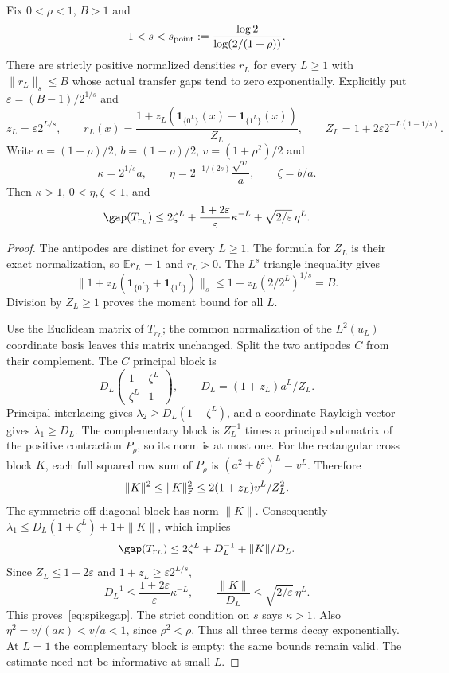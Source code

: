 \begin{theorem}\label{thm:spikes}
Fix $0<\rho<1$, $B>1$ and
\[
 1<s<s_{\rm point}:=\frac{\log2}{\log(2/(1+\rho))}.
\]
There are strictly positive normalized densities $r_L$ for every $L\ge1$
with $\|r_L\|_s\le B$ whose actual transfer gaps tend to zero
exponentially. Explicitly put $\varepsilon=(B-1)/2^{1/s}$ and
\[
 z_L=\varepsilon2^{L/s},\qquad
 r_L(x)=\frac{1+z_L(\mathbf1_{\{0^L\}}(x)+\mathbf1_{\{1^L\}}(x))}{Z_L},
 \qquad Z_L=1+2\varepsilon2^{-L(1-1/s)}.
\]
Write $a=(1+\rho)/2$, $b=(1-\rho)/2$, $v=(1+\rho^2)/2$ and
\[
 \kappa=2^{1/s}a,\qquad
 \eta=2^{-1/(2s)}\frac{\sqrt v}{a},\qquad \zeta=b/a.
\]
Then $\kappa>1$, $0<\eta,\zeta<1$, and
\begin{equation}\label{eq:spikegap}
 \gap(T_{r_L})\le2\zeta^L+\frac{1+2\varepsilon}{\varepsilon}\kappa^{-L}
                      +\sqrt{2/\varepsilon}\,\eta^L.
\end{equation}
\end{theorem}
\begin{proof}
The antipodes are distinct for every $L\ge1$. The formula for $Z_L$
is their exact normalization, so $\mathbb E r_L=1$ and $r_L>0$.
The $L^s$ triangle inequality gives
\[
 \|1+z_L(\mathbf1_{\{0^L\}}+\mathbf1_{\{1^L\}})\|_s
 \le1+z_L(2/2^L)^{1/s}=B.
\]
Division by $Z_L\ge1$ proves the moment bound for all $L$.

Use the Euclidean matrix of $T_{r_L}$; the common normalization of the
$L^2(u_L)$ coordinate basis leaves this matrix unchanged. Split the two
antipodes $C$ from their complement. The $C$ principal block is
\[
 D_L\begin{pmatrix}1&\zeta^L\\\zeta^L&1\end{pmatrix},
 \qquad D_L=(1+z_L)a^L/Z_L.
\]
Principal interlacing gives $\lambda_2\ge D_L(1-\zeta^L)$, and a
coordinate Rayleigh vector gives $\lambda_1\ge D_L$. The complementary
block is $Z_L^{-1}$ times a principal submatrix of the positive
contraction $P_\rho$, so its norm is at most one. For the rectangular
cross block $K$, each full squared row sum of $P_\rho$ is
$(a^2+b^2)^L=v^L$. Therefore
\[
 \|K\|^2\le\|K\|_{\rm F}^2\le2(1+z_L)v^L/Z_L^2.
\]
The symmetric off-diagonal block has norm $\|K\|$. Consequently
$\lambda_1\le D_L(1+\zeta^L)+1+\|K\|$, which implies
\[
 \gap(T_{r_L})\le2\zeta^L+D_L^{-1}+\|K\|/D_L.
\]
Since $Z_L\le1+2\varepsilon$ and $1+z_L\ge\varepsilon2^{L/s}$,
\[
 D_L^{-1}\le\frac{1+2\varepsilon}{\varepsilon}\kappa^{-L},
 \qquad \frac{\|K\|}{D_L}\le\sqrt{2/\varepsilon}\,\eta^L.
\]
This proves~\eqref{eq:spikegap}. The strict condition on $s$ says
$\kappa>1$. Also $\eta^2=v/(a\kappa)<v/a<1$, since $\rho^2<\rho$.
Thus all three terms decay exponentially. At $L=1$ the complementary
block is empty; the same bounds remain valid. The estimate need not be
informative at small $L$.
\end{proof}

